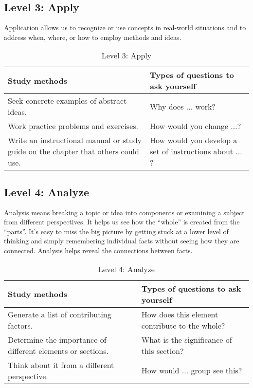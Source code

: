 \documentclass[../main.tex]{subfiles}
\begin{document}
\subsection{Level 3: Apply}
Application allows us to recognize or use concepts in real-world situations and
to address when, where, or how to employ methods and ideas.
%
\begin{table}[H]
  \begin{center}
    \begin{tabular}[c]{p{6cm}p{6cm}}
      \hline
      Study methods & Types of questions to ask yourself \\
      \hline
      Seek concrete examples of abstract ideas. &	Why does $ \ldots $ work? \\
      Work practice problems and exercises. &	How would you change $ \ldots $?
      \\
      Write an instructional manual or study guide on the chapter that others
      could use. &	How would you develop a set of instructions about $ \ldots
      $? \\
      \hline
    \end{tabular}
    \caption{Level 3: Apply}
  \end{center}
\end{table}
%
\subsection{Level 4: Analyze}
Analysis means breaking a topic or idea into components or examining a subject
from different perspectives. It helps us see how the ``whole'' is created from the
``parts''. It's easy to miss the big picture by getting stuck at a lower level of
thinking and simply remembering individual facts without seeing how they are
connected. Analysis helps reveal the connections between facts.
%
\begin{table}[H]
  \begin{center}
    \begin{tabular}[c]{p{6cm}p{6cm}}
      \hline
      Study methods & Types of questions to ask yourself \\
      \hline
      Generate a list of contributing factors. & How does this element
      contribute to the whole? \\
      Determine the importance of different elements or sections. &	What is the
      significance of this section? \\
      Think about it from a different perspective. & How would $ \ldots $ group
      see this? \\
      \hline
    \end{tabular}
    \caption{Level 4: Analyze}
  \end{center}
\end{table}
%
\end{document}
